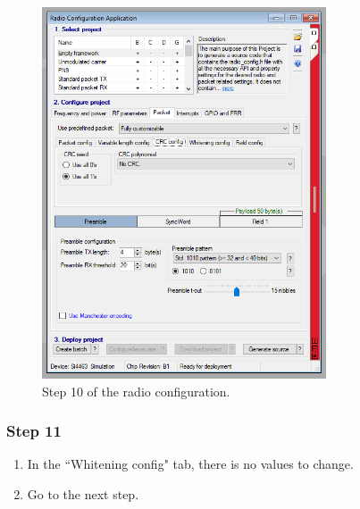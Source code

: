 \begin{figure}[!h]
	\begin{center}
		\includegraphics[width=0.75\textwidth]{figures/wds-tutorial-10.png}
		\caption{Step 10 of the radio configuration.}
		\label{fig:wds-tutorial-step-10}
	\end{center}
\end{figure}

\subsubsection{Step 11}

\begin{enumerate}
    \item In the ``Whitening config" tab, there is no values to change.
    \item Go to the next step.
\end{enumerate}

